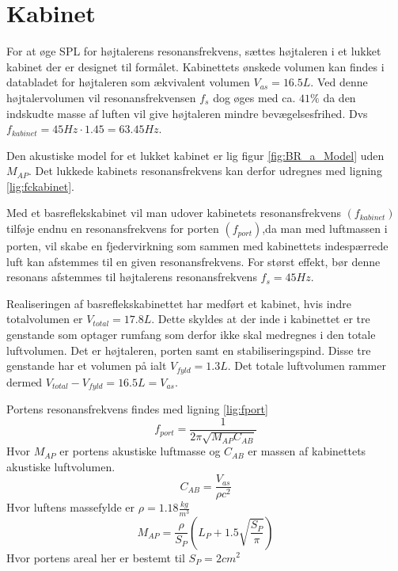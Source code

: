 \section{Kabinet}
\label{sec:theori_calc}
For at øge SPL for højtalerens resonansfrekvens, sættes højtaleren i et lukket kabinet der er designet til formålet.
Kabinettets ønskede volumen kan findes i databladet for højtaleren\cite{FW168} som ækvivalent volumen $V_{as} = 16.5L$. Ved denne højtalervolumen vil resonansfrekvensen $f_s$ dog øges med ca. $41\%$ da den indskudte masse af luften vil give højtaleren mindre bevægelsesfrihed. Dvs $f_{kabinet}=45Hz\cdot1.45=63.45Hz$. 

Den akustiske model for et lukket kabinet er lig figur \ref{fig:BR_a_Model} uden $M_{AP}$. Det lukkede kabinets resonansfrekvens kan derfor udregnes med ligning \ref{lig:fckabinet}.

Med et basreflekskabinet vil man udover kabinetets resonansfrekvens $(f_{kabinet})$ tilføje endnu en resonansfrekvens for porten $(f_{port})$,da man med luftmassen i porten, vil skabe en fjedervirkning som sammen med kabinettets indespærrede luft kan afstemmes til en given resonansfrekvens. For størst effekt, bør denne resonans afstemmes til højtalerens resonansfrekvens $f_s = 45Hz$.

Realiseringen af basreflekskabinettet har medført et kabinet, hvis indre totalvolumen er $V_{total}=17.8L$. Dette skyldes at der inde i kabinettet er tre genstande som optager rumfang som derfor ikke skal medregnes i den totale luftvolumen. Det er højtaleren, porten samt en stabiliseringspind. Disse tre genstande har et volumen på ialt $V_{fyld}=1.3L$. Det totale luftvolumen rammer dermed $V_{total}-V_{fyld}=16.5L=V_{as}$.

Portens resonansfrekvens findes med ligning \ref{lig:fport}
\begin{equation}\label{lig:fport}
f_{port}=\frac{1}{2 \pi \sqrt{M_{AP} C_{AB}}}
\end{equation}
Hvor $M_{AP}$ er portens akustiske luftmasse og $C_{AB}$ er massen af kabinettets akustiske luftvolumen.
\begin{equation}\label{lig:CAB}
C_{AB}=\frac{V_{as}}{\rho c^2}
	\end{equation}
	Hvor luftens massefylde er $\rho=1.18 \frac{kg}{m^3}$ 
\begin{equation}\label{lig:MAP}
M_{AP}=\frac{\rho}{S_P} (L_P+1.5\sqrt{\frac{S_P}{\pi}})
\end{equation}	
Hvor portens areal her er bestemt til $S_P=2cm^2$

